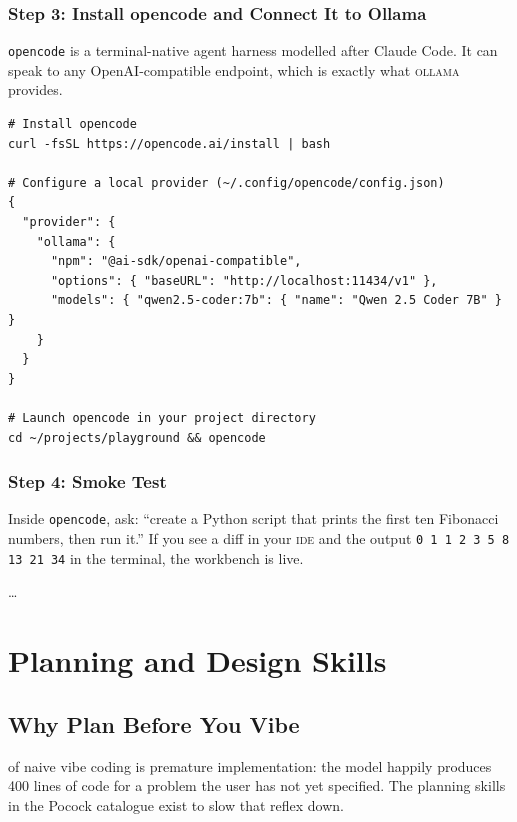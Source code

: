 \documentclass{../sharedAssets/tufte}
\begin{document}
\subsection*{Step 3: Install opencode and Connect It to Ollama}

\texttt{opencode}\cite{opencode2025} is a terminal-native agent harness
modelled after Claude Code. It can speak to any OpenAI-compatible
endpoint, which is exactly what \textsc{ollama} provides.

\begin{fullwidth}
\begin{verbatim}
# Install opencode
curl -fsSL https://opencode.ai/install | bash

# Configure a local provider (~/.config/opencode/config.json)
{
  "provider": {
    "ollama": {
      "npm": "@ai-sdk/openai-compatible",
      "options": { "baseURL": "http://localhost:11434/v1" },
      "models": { "qwen2.5-coder:7b": { "name": "Qwen 2.5 Coder 7B" } }
    }
  }
}

# Launch opencode in your project directory
cd ~/projects/playground && opencode
\end{verbatim}
\end{fullwidth}

\subsection*{Step 4: Smoke Test}

Inside \texttt{opencode}, ask: ``create a Python script that prints
the first ten Fibonacci numbers, then run it.'' If you see a diff in your
\textsc{ide} and the output \texttt{0 1 1 2 3 5 8 13 21 34} in the
terminal, the workbench is live.

\vspace{1em}
\dots

\chapter{Planning and Design Skills}
\label{ch:planning}

\section{Why Plan Before You Vibe}
\label{sec:why-plan}

 of naive vibe coding is
premature implementation: the model happily produces 400 lines of
code for a problem the user has not yet specified. The planning skills in
the Pocock catalogue exist to slow that reflex down.
\end{document}
